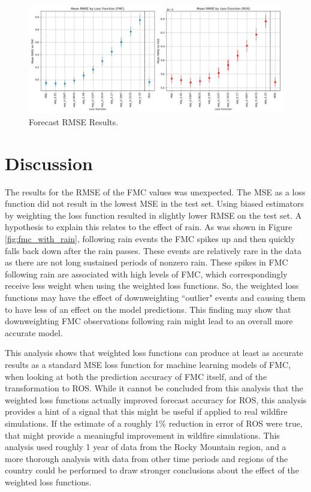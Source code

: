 \documentclass[11pt]{article}%
\begin{document}
\begin{figure}[ht]
    \centering
    \includegraphics[width=1\textwidth]{images/results1.png}
    \caption{Forecast RMSE Results.}
    \label{fig:results1}
\end{figure}

\section{Discussion}

The results for the RMSE of the FMC values was unexpected. The MSE as a loss function did not result in the lowest MSE in the test set. Using biased estimators by weighting the loss function resulted in slightly lower RMSE on the test set. A hypothesis to explain this relates to the effect of rain. As was shown in Figure \ref{fig:fmc_with_rain}, following rain events the FMC spikes up and then quickly falls back down after the rain passes. These events are relatively rare in the data as there are not long sustained periods of nonzero rain. These spikes in FMC following rain are associated with high levels of FMC, which correspondingly receive less weight when using the weighted loss functions. So, the weighted loss functions may have the effect of downweighting ``outlier" events and causing them to have less of an effect on the model predictions. This finding may show that downweighting FMC observations following rain might lead to an overall more accurate model.

This analysis shows that weighted loss functions can produce at least as accurate results as a standard MSE loss function for machine learning models of FMC, when looking at both the prediction accuracy of FMC itself, and of the transformation to ROS. While it cannot be concluded from this analysis that the weighted loss functions actually improved forecast accuracy for ROS, this analysis provides a hint of a signal that this might be useful if applied to real wildfire simulations. If the estimate of a roughly 1\% reduction in error of ROS were true, that might provide a meaningful improvement in wildfire simulations. This analysis used roughly 1 year of data from the Rocky Mountain region, and a more thorough analysis with data from other time periods and regions of the country could be performed to draw stronger conclusions about the effect of the weighted loss functions.
\end{document}
